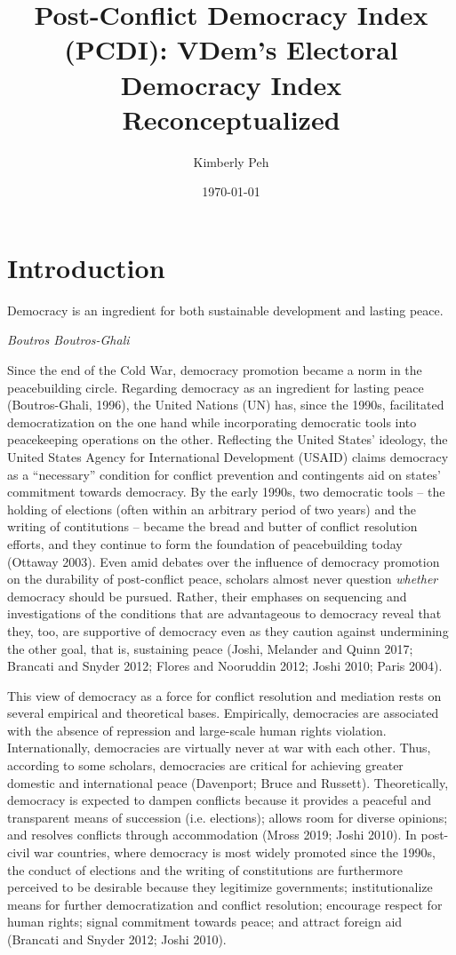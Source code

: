 \documentclass [11pt]{article}
\title{Post-Conflict Democracy Index (PCDI): VDem's Electoral Democracy Index Reconceptualized}
\author{Kimberly Peh}
\date{\today}
\begin{document}
\maketitle

\section*{Introduction} 

\epigraph{Democracy is an ingredient for both sustainable development and lasting peace.}{\emph{Boutros Boutros-Ghali}}

Since the end of the Cold War, democracy promotion became a norm in the peacebuilding circle. Regarding democracy as an ingredient for lasting peace (Boutros-Ghali, 1996), the United Nations (UN) has, since the 1990s, facilitated democratization on the one hand while incorporating democratic tools into peacekeeping operations on the other. Reflecting the United States' ideology, the United States Agency for International Development (USAID) claims democracy as a ``necessary'' condition for conflict prevention and contingents aid on states' commitment towards democracy. By the early 1990s, two democratic tools -- the holding of elections (often within an arbitrary period of two years) and the writing of contitutions -- became the bread and butter of conflict resolution efforts, and they continue to form the foundation of peacebuilding today (Ottaway 2003). Even amid debates over the influence of democracy promotion on the durability of post-conflict peace, scholars almost never question \emph{whether} democracy should be pursued. Rather, their emphases on sequencing and investigations of the conditions that are advantageous to democracy reveal that they, too, are supportive of democracy even as they caution against undermining the other goal, that is, sustaining peace (Joshi, Melander and Quinn 2017; Brancati and Snyder 2012; Flores and Nooruddin 2012; Joshi 2010; Paris 2004).

This view of democracy as a force for conflict resolution and mediation rests on several empirical and theoretical bases. Empirically, democracies are associated with the absence of repression and large-scale human rights violation. Internationally, democracies are virtually never at war with each other. Thus, according to some scholars, democracies are critical for achieving greater domestic and international peace (Davenport; Bruce and Russett). Theoretically, democracy is expected to dampen conflicts because it provides a peaceful and transparent means of succession (i.e. elections); allows room for diverse opinions; and resolves conflicts through accommodation (Mross 2019; Joshi 2010). In post-civil war countries, where democracy is most widely promoted since the 1990s, the conduct of elections and the writing of constitutions are furthermore perceived to be desirable because they legitimize governments; institutionalize means for further democratization and conflict resolution; encourage respect for human rights; signal commitment towards peace; and attract foreign aid (Brancati and Snyder 2012; Joshi 2010).
\end{document}

